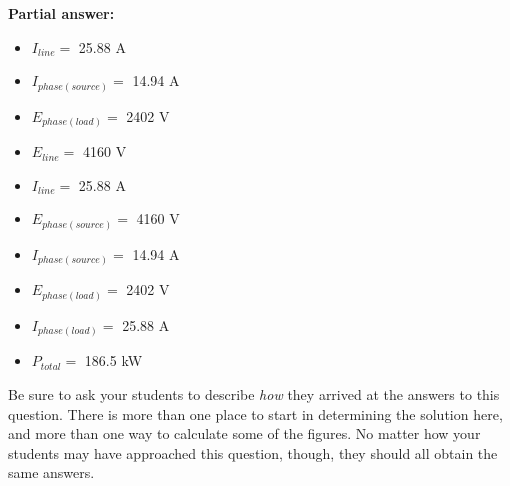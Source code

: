 





\noindent
{\bf Partial answer:}

\begin{itemize}
\item{} $I_{line} =$ 25.88 A
\item{} $I_{phase(source)} =$ 14.94 A
\item{} $E_{phase(load)} =$ 2402 V
\end{itemize}







\begin{itemize}
\item{} $E_{line} =$ 4160 V
\item{} $I_{line} =$ 25.88 A
\item{} $E_{phase(source)} =$ 4160 V
\item{} $I_{phase(source)} =$ 14.94 A
\item{} $E_{phase(load)} =$ 2402 V
\item{} $I_{phase(load)} =$ 25.88 A
\item{} $P_{total} =$ 186.5 kW
\end{itemize}

\vskip 10pt

Be sure to ask your students to describe {\it how} they arrived at the answers to this question.  There is more than one place to start in determining the solution here, and more than one way to calculate some of the figures.  No matter how your students may have approached this question, though, they should all obtain the same answers.





